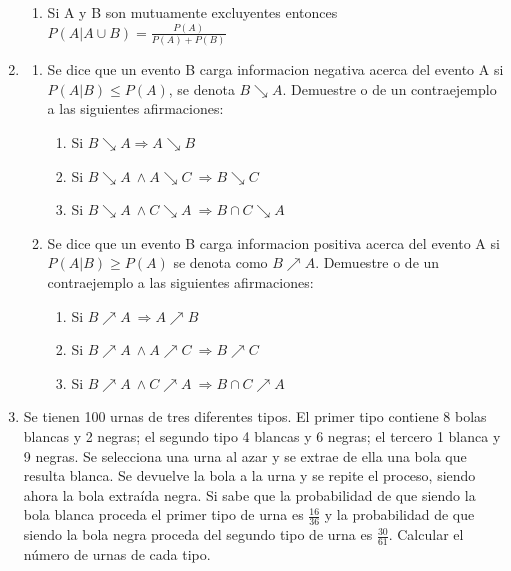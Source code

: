 \documentclass[12pt,a4paper]{report}
\begin{document}
\begin{enumerate}
{\begin{enumerate}[label=\alph*) ]
	\item{Si A y B son mutuamente excluyentes entonces $P(A|A \cup B)=\frac{P(A)}{P(A)+P(B)}$}



\end{enumerate}

	}


   \item {
   
	\begin{enumerate}[label=\alph*) ]
   \item {
	Se dice que un evento B carga informacion negativa acerca del evento A si $P(A|B) \leq P(A)$, se denota  $B \searrow A$. Demuestre o de un contraejemplo a las siguientes afirmaciones:
		\begin{enumerate}
		\item{Si $B \searrow A \Rightarrow A \searrow B$}\\
		\item{Si $B \searrow A \ \wedge A \searrow C \ \Rightarrow B \searrow C$}\\
		\item{Si $B \searrow A \ \wedge C \searrow A \ \Rightarrow B\cap C \searrow A$}
		\end{enumerate}


   }

   \item {
 Se dice que un evento B carga informacion positiva acerca del evento A si
 $P(A|B) \geq P(A)$ se denota como $B \nearrow A$. Demuestre o de un contraejemplo a las siguientes afirmaciones:
 \begin{enumerate}
 \item{Si $B\nearrow A \ \Rightarrow A\nearrow B$}\\
 \item{Si $B \nearrow A \ \wedge A \nearrow C \ \Rightarrow B \nearrow C$}\\
 \item{Si $B \nearrow A \ \wedge C \nearrow A \ \Rightarrow B\cap C \nearrow A$}
 \end{enumerate}

   }




	\end{enumerate}

	}

   \item {
  	Se tienen 100 urnas de tres diferentes tipos. El primer tipo contiene 8 bolas blancas y 2 negras; el segundo tipo 4 blancas y 6 negras; el tercero 1 blanca y 9 negras. Se selecciona una urna al azar y se extrae de ella una bola que resulta blanca. Se devuelve la bola a la urna y se repite el proceso, siendo ahora la bola extraída negra. Si sabe que la probabilidad de que siendo la bola blanca proceda el primer tipo de urna es $\frac{16}{36	}$ y la probabilidad de que siendo la bola negra proceda del segundo tipo de urna es $  \frac{30}{61}$. Calcular el número de urnas de cada tipo.
	}


\end{enumerate}
\end{document}
